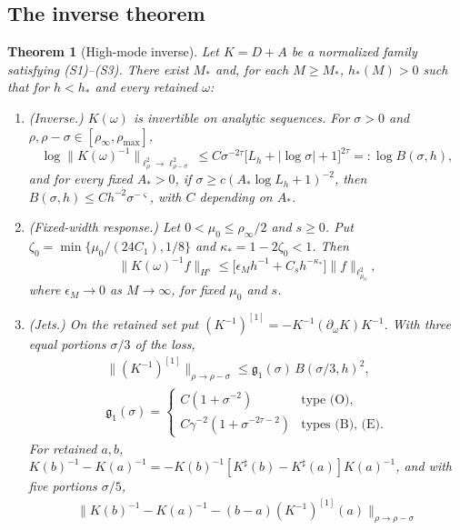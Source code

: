 \documentclass[11pt]{amsart}
\numberwithin{equation}{section}
\newtheorem{theorem}{Theorem}[section]
\theoremstyle{definition}
\theoremstyle{remark}
\newcommand{\abs}[1]{\lvert #1\rvert}
\newcommand{\norm}[1]{\lVert #1\rVert}
\begin{document}
\subsection{The inverse theorem}

\begin{theorem}[High-mode inverse]\label{thm:highinverse}
Let $K=D+A$ be a normalized family satisfying \textup{(S1)--(S3)}. There exist $M_*$ and, for each $M\ge M_*$, $h_*(M)>0$ such that for $h<h_*$ and every retained $\omega$:
\begin{enumerate}[label=\textup{(\roman*)}]
\item \textup{(Inverse.)} $K(\omega)$ is invertible on analytic sequences. For $\sigma>0$ and $\rho,\rho-\sigma\in[\rho_\infty,\rho_{\max}]$,
\begin{equation}\label{eq:Rcost}
\log\norm{K(\omega)^{-1}}_{\ell^2_\rho\to\ell^2_{\rho-\sigma}}\le C\sigma^{-2\tau}\bigl[L_h+\abs{\log\sigma}+1\bigr]^{2\tau}=:\log B(\sigma,h),
\end{equation}
and for every fixed $A_*>0$, if $\sigma\ge c(A_*\log L_h+1)^{-2}$, then $B(\sigma,h)\le Ch^{-2}\sigma^{-\varsigma}$, with $C$ depending on $A_*$.
\item \textup{(Fixed-width response.)} Let $0<\mu_0\le\rho_\infty/2$ and $s\ge0$. Put $\zeta_0=\min\{\mu_0/(24C_1),1/8\}$ and $\kappa_*=1-2\zeta_0<1$. Then
\[
\norm{K(\omega)^{-1}f}_{H^s}\le\bigl[\epsilon_Mh^{-1}+C_sh^{-\kappa_*}\bigr]\norm f_{\ell^2_{\mu_0}},
\]
where $\epsilon_M\to0$ as $M\to\infty$, for fixed $\mu_0$ and $s$.
\item \textup{(Jets.)} On the retained set put $(K^{-1})^{[1]}=-K^{-1}(\partial_\omega K)K^{-1}$. With three equal portions $\sigma/3$ of the loss,
\begin{equation}\label{eq:Rjet}
\begin{gathered}
\norm{(K^{-1})^{[1]}}_{\rho\to\rho-\sigma}\le\mathfrak g_1(\sigma)\,B(\sigma/3,h)^2,\\
\mathfrak g_1(\sigma)=\begin{cases}C(1+\sigma^{-2})&\text{type (O)},\\ C\gamma^{-2}(1+\sigma^{-2\tau-2})&\text{types (B), (E)}.\end{cases}
\end{gathered}
\end{equation}
For retained $a,b$, $K(b)^{-1}-K(a)^{-1}=-K(b)^{-1}[K^\sharp(b)-K^\sharp(a)]K(a)^{-1}$, and with five portions $\sigma/5$,
\begin{multline}\label{eq:Rwhitney}
\norm{K(b)^{-1}-K(a)^{-1}-(b-a)(K^{-1})^{[1]}(a)}_{\rho\to\rho-\sigma}\\

\end{multline}
\end{enumerate}
\end{theorem}
\end{document}
